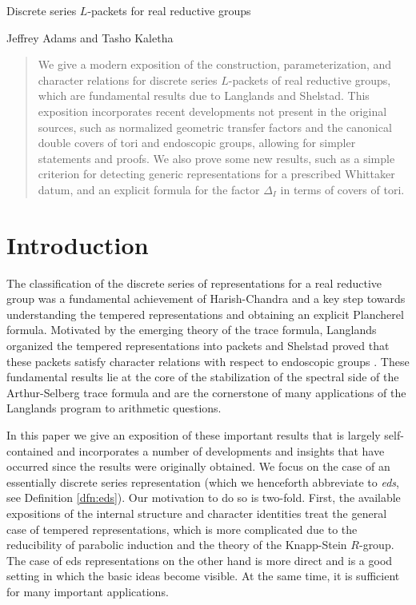 \documentclass{article}
\theoremstyle{definition}
\numberwithin{equation}{section}
\renewcommand{\-}{\hyp{}}
\begin{document}
\begin{mytitle} Discrete series $L$\-packets for real reductive groups \end{mytitle}
\begin{center} Jeffrey Adams and Tasho Kaletha \end{center}

{\let\thefootnote\relax{}}


\begin{abstract}
We give a modern exposition of the construction, parameterization, and character relations for discrete series $L$\-packets of real reductive groups, which are fundamental results due to Langlands and Shelstad. This exposition incorporates recent developments not present in the original sources, such as normalized geometric transfer factors and the canonical double covers of tori and endoscopic groups, allowing for simpler statements and proofs. We also prove some new results, such as a simple criterion for detecting generic representations for a prescribed Whittaker datum, and an explicit formula for the factor $\Delta_I$ in terms of covers of tori.
\end{abstract}

\tableofcontents

\section{Introduction}

The classification of the discrete series of representations for a real reductive group was a fundamental achievement of Harish-Chandra and a key step towards understanding the tempered representations and obtaining an explicit Plancherel formula. Motivated by the emerging theory of the trace formula, Langlands organized the tempered representations into packets \cite{Lan89} and Shelstad proved that these packets satisfy character relations with respect to endoscopic groups \cite{She82}. These fundamental results lie at the core of the stabilization of the spectral side of the Arthur-Selberg trace formula and are the cornerstone of many applications of the Langlands program to arithmetic questions. 

In this paper we give an exposition of these important results that is largely self-contained and incorporates a number of developments and insights that have occurred since the results were originally obtained. We focus on the case of an essentially discrete series representation (which we henceforth abbreviate to \emph{eds}, see Definition \ref{dfn:eds}). Our motivation to do so is two-fold. First, the available expositions of the internal structure and character identities treat the general case of tempered representations, which is more complicated due to the reducibility of parabolic induction and the theory of the Knapp-Stein $R$-group. The case of eds representations on the other hand is more direct and is a good setting in which the basic ideas become visible. At the same time, it is sufficient for many important applications.
\end{document}
